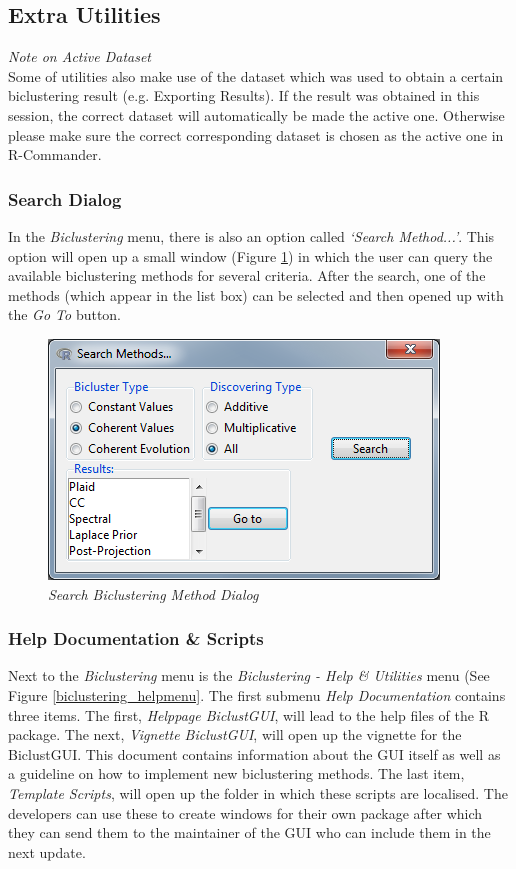 \documentclass[a4paper]{article}\usepackage[]{graphicx}\usepackage[]{color}
\begin{document}
\subsection{Extra Utilities}
{\it Note on Active Dataset}\\
Some of utilities also make use of the dataset which was used to obtain a
certain biclustering result (e.g. Exporting Results). If the result was obtained in this
session, the correct dataset will automatically be made the active one.
Otherwise please make sure the correct corresponding dataset is chosen as the
active one in R-Commander.
\subsubsection{Search Dialog}
In the {\it Biclustering} menu, there is also an option called {\it `Search
Method...'}. This option will open up a small window (Figure
\ref{searchwindow}) in which the user can query the available biclustering
methods for several criteria. After the search, one of the methods (which appear
in the list box) can be selected and then opened up with the {\it Go To} button.

\begin{figure}[H]
\centering
\includegraphics[scale=0.6]{figures/searchwindow.png}
\caption{{\it Search Biclustering Method Dialog }\label{searchwindow}}
\end{figure}

\subsubsection{Help Documentation \& Scripts}
Next to the {\it Biclustering} menu is the {\it Biclustering - Help \&
Utilities} menu (See Figure \ref{biclustering_helpmenu}. The first submenu {\it Help
Documentation} contains three items. The first, {\it Helppage BiclustGUI}, will
lead to the help files of the R package. The next, {\it Vignette BiclustGUI},
will open up the vignette for the BiclustGUI. This document contains information
about the GUI itself as well as a guideline on how to implement new biclustering
methods. The last item, {\it Template Scripts}, will open up the folder in which
these scripts are localised. The developers can use these to create windows for
their own package after which they can send them to the maintainer of the GUI
who can include them in the next update.
\end{document}
